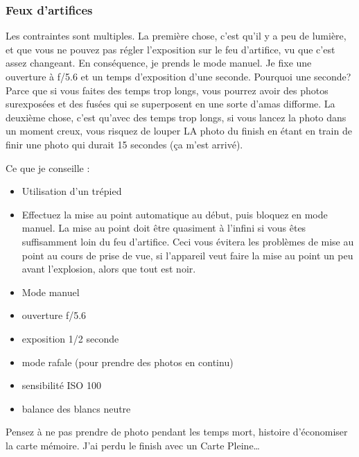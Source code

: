 \documentclass[a4paper,twoside]{article}
\begin{document}
\subsubsection{Feux d'artifices}
Les contraintes sont multiples. La première chose, c'est qu'il y a peu de lumière, et que vous ne pouvez pas régler l'exposition sur le feu d'artifice, vu que c'est assez changeant. En conséquence, je prends le mode manuel. Je fixe une ouverture à f/5.6 et un temps d'exposition d'une seconde. Pourquoi une seconde? Parce que si vous faites des temps trop longs, vous pourrez avoir des photos surexposées et des fusées qui se superposent en une sorte d'amas difforme. La deuxième chose, c'est qu'avec des temps trop longs, si vous lancez la photo dans un moment creux, vous risquez de louper LA photo du finish en étant en train de finir une photo qui durait 15 secondes (ça m'est arrivé). 

Ce que je conseille : 
\begin{itemize}
\item Utilisation d'un trépied
\item Effectuez la mise au point automatique au début, puis bloquez en mode manuel. La mise au point doit être quasiment à l'infini si vous êtes suffisamment loin du feu d'artifice. Ceci vous évitera les problèmes de mise au point au cours de prise de vue, si l'appareil veut faire la mise au point un peu avant l'explosion, alors que tout est noir.
\item Mode manuel
\item ouverture f/5.6
\item exposition 1/2 seconde
\item mode rafale (pour prendre des photos en continu)
\item sensibilité ISO 100
\item balance des blancs neutre
\end{itemize}

\begin{remarque}
Pensez à ne pas prendre de photo pendant les temps mort, histoire d'économiser la carte mémoire. J'ai perdu le finish avec un \og Carte Pleine\fg\dots
\end{remarque}


\printindex
\end{document}
